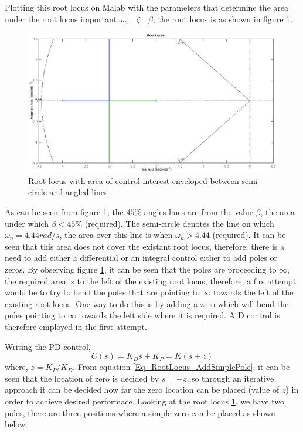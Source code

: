 Plotting this root locus on Malab with the parameters that determine the area under the root locus important $\omega_{n} \quad \zeta \quad \beta$, the root locus is as shown in figure \ref{Fig_RootLocus_Ex_2_rLocus}.
\begin{figure}[h!]
	\centering
	\includegraphics[width=\linewidth]{Bilder/RootLocus_ControlDesign_rLocus.eps}
	\caption{Root locus with area of control interest enveloped between semi-circle and angled lines}
	\label{Fig_RootLocus_Ex_2_rLocus}
\end{figure}
\newpage
As can be seen from figure \ref{Fig_RootLocus_Ex_2_rLocus}, the $45 \%$ angles lines are from the value $\beta$, the area under which $\beta < 45 \%$ (required). The semi-circle denotes the line on which $\omega_{n} = 4.44 rad/s$, the area over this line is when $\omega_{n} > 4.44$ (required). It can be seen that this area does not cover the existant root locus, therefore, there is a need to add either a differential or an integral control either to add poles or zeros. By observing figure \ref{Fig_RootLocus_Ex_2_rLocus}, it can be seen that the poles are proceeding to $\infty$, the required area is to the left of the existing root locus, therefore, a firs attempt would be to try to bend the poles that are pointing to $\infty$ towards the left of the existing root locus. One way to do this is by adding a zero which will bend the poles pointing to $\infty$ towards the left side where it is required. A D control is therefore employed in the first attempt. 

Writing the PD control,
\begin{equation} \label{Eq_RootLocus_AddSimplePole}
	C(s) = K_D s + K_P = K (s + z)
\end{equation}
where, $z = K_P / K_D$. From equation \eqref{Eq_RootLocus_AddSimplePole}, it can be seen that the location of zero is decided by $s = -z$, so through an iterative approach it can be decided how far the zero location can be placed (value of $z$) in order to achieve desired performace. Looking at the root locus \ref{Fig_RootLocus_Ex_2_rLocus}, we have two poles, there are three positions where a simple zero can be placed as shown below.
